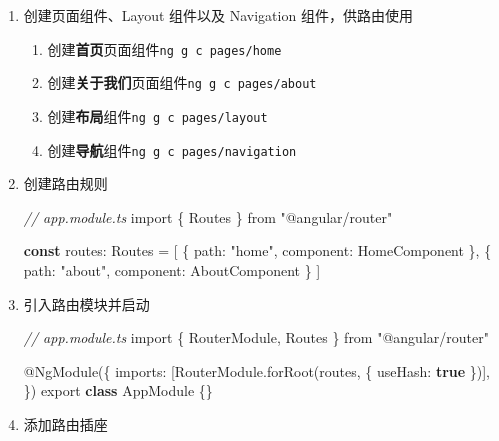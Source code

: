 \documentclass[
]{article}
\newenvironment{Shaded}{}{}
\newcommand{\CommentTok}[1]{\textcolor[rgb]{0.38,0.63,0.69}{\textit{#1}}}
\newcommand{\DataTypeTok}[1]{\textcolor[rgb]{0.56,0.13,0.00}{#1}}
\newcommand{\FunctionTok}[1]{\textcolor[rgb]{0.02,0.16,0.49}{#1}}
\newcommand{\ImportTok}[1]{#1}
\newcommand{\KeywordTok}[1]{\textcolor[rgb]{0.00,0.44,0.13}{\textbf{#1}}}
\newcommand{\NormalTok}[1]{#1}
\newcommand{\OperatorTok}[1]{\textcolor[rgb]{0.40,0.40,0.40}{#1}}
\newcommand{\StringTok}[1]{\textcolor[rgb]{0.25,0.44,0.63}{#1}}
\begin{document}
\begin{enumerate}
\def\labelenumi{\arabic{enumi}.}
\item
  创建页面组件、Layout 组件以及 Navigation 组件，供路由使用

  \begin{enumerate}
  \def\labelenumii{\arabic{enumii}.}
  \item
    创建\textbf{首页}页面组件\texttt{ng\ g\ c\ pages/home}
  \item
    创建\textbf{关于我们}页面组件\texttt{ng\ g\ c\ pages/about}
  \item
    创建\textbf{布局}组件\texttt{ng\ g\ c\ pages/layout}
  \item
    创建\textbf{导航}组件\texttt{ng\ g\ c\ pages/navigation}
  \end{enumerate}
\item
  创建路由规则

\begin{Shaded}
\begin{Highlighting}[]
\CommentTok{// app.module.ts}
\ImportTok{import}\NormalTok{ \{ Routes \} }\ImportTok{from} \StringTok{"@angular/router"}

\KeywordTok{const}\NormalTok{ routes}\OperatorTok{:}\NormalTok{ Routes }\OperatorTok{=}\NormalTok{ [}
\NormalTok{  \{}
    \DataTypeTok{path}\OperatorTok{:} \StringTok{"home"}\OperatorTok{,}
    \DataTypeTok{component}\OperatorTok{:}\NormalTok{ HomeComponent}
\NormalTok{  \}}\OperatorTok{,}
\NormalTok{  \{}
    \DataTypeTok{path}\OperatorTok{:} \StringTok{"about"}\OperatorTok{,}
    \DataTypeTok{component}\OperatorTok{:}\NormalTok{ AboutComponent}
\NormalTok{  \}}
\NormalTok{]}
\end{Highlighting}
\end{Shaded}
\item
  引入路由模块并启动

\begin{Shaded}
\begin{Highlighting}[]
\CommentTok{// app.module.ts}
\ImportTok{import}\NormalTok{ \{ RouterModule}\OperatorTok{,}\NormalTok{ Routes \} }\ImportTok{from} \StringTok{"@angular/router"}

\NormalTok{@}\FunctionTok{NgModule}\NormalTok{(\{}
  \DataTypeTok{imports}\OperatorTok{:}\NormalTok{ [RouterModule}\OperatorTok{.}\FunctionTok{forRoot}\NormalTok{(routes}\OperatorTok{,}\NormalTok{ \{ }\DataTypeTok{useHash}\OperatorTok{:} \KeywordTok{true}\NormalTok{ \})]}\OperatorTok{,}
\NormalTok{\})}
\ImportTok{export} \KeywordTok{class}\NormalTok{ AppModule \{\}}
\end{Highlighting}
\end{Shaded}
\item
  添加路由插座


\end{enumerate}
\end{document}

